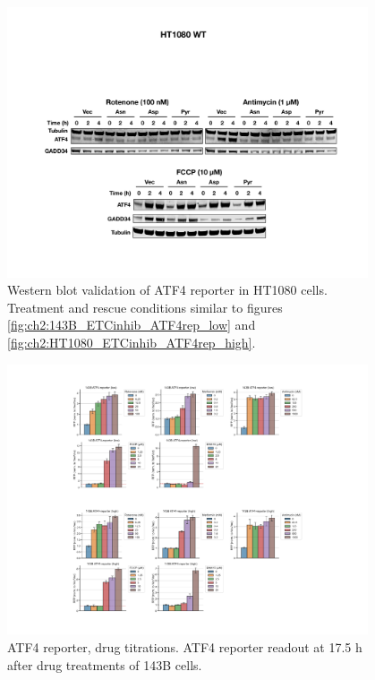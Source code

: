 \begin{figure}[ht]
    \centering
    \includegraphics[width=0.95\textwidth]{figures/chap2/app/HT1080_ISR_western.pdf}
    \caption[Mitochondrial inhibitor, ATF4 western.]{
    Western blot validation of ATF4 reporter in HT1080 cells.
    Treatment and rescue conditions similar to figures \ref{fig:ch2:143B_ETCinhib_ATF4rep_low} and \ref{fig:ch2:HT1080_ETCinhib_ATF4rep_high}.
    }
    \label{fig:app_ch2:HT1080_ISR_western}
\end{figure}

\begin{figure}[ht]
    \centering
    \includegraphics[width=0.95\textwidth]{figures/chap2/app/atf4_ETCtit.pdf}
    \caption[ATF4 reporter, drug titrations.]{
    ATF4 reporter, drug titrations.
    ATF4 reporter readout at 17.5 h after drug treatments of 143B cells.
    }
    \label{fig:app_ch2:atf4_ETCtit}
\end{figure}

